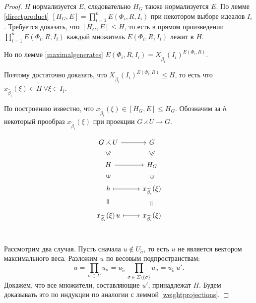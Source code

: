 \documentclass[10pt]{article}
\theoremstyle{remark}
\renewcommand{\le}{\leqslant}
\begin{document}
\begin{proof}
  $H$ нормализуется $E$, следовательно $H_G$ также нормализуется $E$. По лемме \ref{directproduct} $[H_G,E] = \prod_{i=1}^n E(\Phi_i,R,I_i)$ при некотором выборе идеалов $I_i$. Требуется доказать, что $[H_G,E] \le H$, то есть в прямом произведении $\prod_{i=1}^n E(\Phi_i,R,I_i)$ каждый множитель $E(\Phi_i,R,I_i)$  лежит в $H$.

Но по лемме \ref{maximalgenerates} $E(\Phi_i,R,I_i) = X_{\widetilde\beta_i}(I_i)^{E(\Phi_i,R)}$.

Поэтому достаточно доказать, что $X_{\widetilde\beta_i}(I_i)^{E(\Phi_i,R)} \le H$, то есть что
$x_{\widetilde{\beta_i}}(\xi) \in H \ \forall \xi \in I_i$.

По построению известно, что $x_{\widetilde\beta_i}(\xi) \in [H_G,E] \le H_G$.
Обозначим за $h$ некоторый прообраз $x_{\widetilde\beta_i}(\xi)$ при проекции $G \rightthreetimes U \rightarrow G$.

\begin{equation*}
\tikzset{
  Subgroup/.style={
    draw=none,
    every to/.append style={
      edge node={node [sloped, allow upside down, auto=false]{$\le$}}}},
  Equals/.style={
    draw=none,
    every to/.append style={
      edge node={node [sloped, allow upside down, auto=false]{$=$}}}},
  Included/.style={
    draw=none,
    every to/.append style={
      edge node={node [sloped, allow upside down, auto=false]{$\in$}}}}
}
\begin{tikzcd}
G \rightthreetimes U \arrow{r}{} & G \\
H \arrow[Subgroup]{u} \arrow{r}{} & H_G \arrow[Subgroup]{u} \\
h \arrow[Included]{u} \arrow[maps to]{r}{} & x_{\widetilde\beta_i}(\xi) \arrow[Included]{u} \\
x_{\widetilde\beta_i}(\xi)\,u \arrow[Equals]{u} \arrow[maps to]{r}{} & x_{\widetilde\beta_i}(\xi) \arrow[Equals]{u} \\
\end{tikzcd}
\end{equation*}

Рассмотрим два случая. Пусть сначала $u \notin U_{\widetilde\sigma}$, то есть $u$ не является вектором максимального веса.
Разложим $u$ по весовым подпространствам: $$u = \prod_{\sigma \in \Sigma} u_\sigma = u_{\widetilde\sigma} \, \prod_{\sigma \in \Sigma \setminus \{\widetilde\sigma\} } u_\sigma = u_{\widetilde\sigma} \, u'  .$$
Докажем, что все множители, составляющие $u'$, принадлежат $H$. Будем доказывать это по индукции по аналогии с леммой \ref{weightprojections}.


\end{proof}
\end{document}
